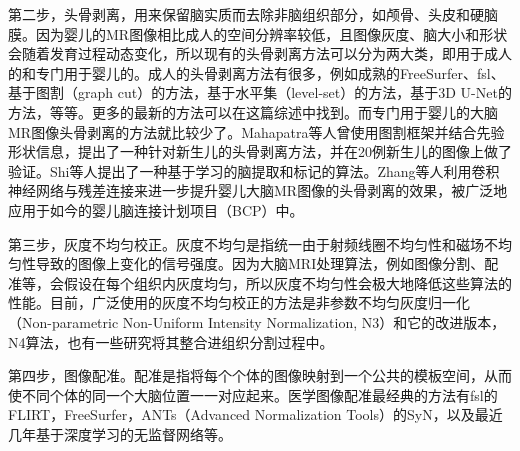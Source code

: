 第二步，头骨剥离，用来保留脑实质而去除非脑组织部分，如颅骨、头皮和硬脑膜。因为婴儿的MR图像相比成人的空间分辨率较低，且图像灰度、脑大小和形状会随着发育过程动态变化，所以现有的头骨剥离方法可以分为两大类，即用于成人的和专门用于婴儿的。成人的头骨剥离方法有很多，例如成熟的FreeSurfer\cite{fischl2012freesurfer}、fsl\cite{jenkinson2012fsl}、基于图割（graph cut）的方法\cite{sadananthan2010skull}，基于水平集（level-set）的方法\cite{zhuang2006skull}，基于3D U-Net的方法\cite{hwang20193d}，等等。更多的最新的方法可以在这篇综述中找到\cite{kalavathi2016methods}。而专门用于婴儿的大脑MR图像头骨剥离的方法就比较少了。Mahapatra等人\cite{mahapatra2012skull}曾使用图割框架并结合先验形状信息，提出了一种针对新生儿的头骨剥离方法，并在20例新生儿的图像上做了验证。Shi等人\cite{shi2012label}提出了一种基于学习的脑提取和标记的算法。Zhang等人\cite{zhang2019frnet}利用卷积神经网络与残差连接来进一步提升婴儿大脑MR图像的头骨剥离的效果，被广泛地应用于如今的婴儿脑连接计划项目（BCP）中。

第三步，灰度不均匀校正\cite{belaroussi2006intensity}。灰度不均匀是指统一由于射频线圈不均匀性和磁场不均匀性\cite{vovk2007review}导致的图像上变化的信号强度。因为大脑MRI处理算法，例如图像分割、配准等，会假设在每个组织内灰度均匀，所以灰度不均匀性会极大地降低这些算法的性能。目前，广泛使用的灰度不均匀校正的方法是非参数不均匀灰度归一化（Non-parametric Non-Uniform Intensity Normalization, N3）\cite{sled1998nonparametric}和它的改进版本，N4算法\cite{tustison2010n4itk}，也有一些研究将其整合进组织分割过程中\cite{wang2011automatic}。

第四步，图像配准\cite{sotiras2013deformable}。配准是指将每个个体的图像映射到一个公共的模板空间，从而使不同个体的同一个大脑位置一一对应起来。医学图像配准最经典的方法有fsl的FLIRT\cite{jenkinson2001global,jenkinson2002improved}，FreeSurfer\cite{fischl2012freesurfer}，ANTs（Advanced Normalization Tools）的SyN\cite{avants2008symmetric}，以及最近几年基于深度学习的无监督网络\cite{dalca2018unsupervised,balakrishnan2018unsupervised,niethammer2019metric,de2019deep}等。

